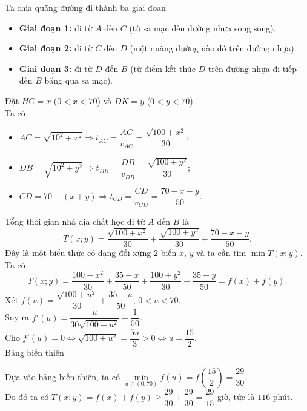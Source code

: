 \begin{ex}
{\begin{center}
		\end{center}
		Ta chia quãng đường đi thành ba giai đoạn 
		\begin{itemize}
			\item\textbf{ Giai đoạn 1:} đi từ $A$ đến $C$ (từ sa mạc đến đường nhựa song song).
			\item \textbf{Giai đoạn 2:} đi từ $C$ đến $D$ (một quãng đường nào đó trên đường nhựa).
			\item \textbf{Giai đoạn 3:} đi từ $D$ đến $B$ (từ điểm kết thúc $D$ trên đường nhựa đi tiếp đến $B$ băng qua sa mạc).
		\end{itemize}
		Đặt $HC=x$ ($0<x<70$) và $DK=y$ ($0<y<70$).\\
		Ta có
		\begin{itemize}
			\item $AC=\sqrt{10^2+x^2} \Rightarrow t_{AC}=\dfrac{AC}{v_{AC}}=\dfrac{\sqrt{100+x^2}}{30}$;
			\item $DB=\sqrt{10^2+y^2} \Rightarrow t_{DB}=\dfrac{DB}{v_{DB}}=\dfrac{\sqrt{100+y^2}}{30}$;
			\item $CD=70-(x+y) \Rightarrow t_{CD}=\dfrac{CD}{v_{CD}}=\dfrac{70-x-y}{50}$.
		\end{itemize}
		Tổng thời gian nhà địa chất học đi từ $A$ đến $B$ là \[T(x;y)=\dfrac{\sqrt{100+x^2}}{30}+\dfrac{\sqrt{100+y^2}}{30}+\dfrac{70-x-y}{50}.\]
		Đây là một biểu thức có dạng đối xứng $2$ biến $x$, $y$ và ta cần tìm $\min T(x;y)$.\\
		Ta có $$T(x;y)=\dfrac{100+x^2}{30}+\dfrac{35-x}{50}+\dfrac{100+y^2}{30}+\dfrac{35-y}{50}=f(x)+f(y).$$
		Xét $f(u)=\dfrac{\sqrt{100+u^2}}{30}+\dfrac{35-u}{50}$, $0<u<70$.\\
		Suy ra $f'(u)=\dfrac{u}{30\sqrt{100+u^2}}-\dfrac{1}{50}$.\\
		Cho $f'(u)=0 \Leftrightarrow \sqrt{100+u^2}=\dfrac{5u}{3}>0 \Leftrightarrow u=\dfrac{15}{2}$.\\
		Bảng biến thiên
		\begin{center}
		\end{center}
		Dựa vào bảng biến thiên, ta có $\min\limits_{u \in (0;70)} f(u)=f\left(\dfrac{15}{2}\right)=\dfrac{29}{30}$.\\
		Do đó ta có $T(x;y)=f(x)+f(y) \ge \dfrac{29}{30}+\dfrac{29}{30}=\dfrac{29}{15}$ giờ, tức là $116$ phút.
	}
\end{ex}


